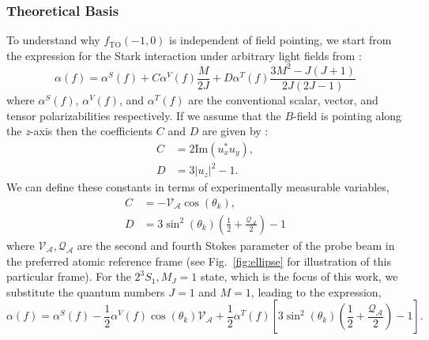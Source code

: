 \documentclass[%
 amsmath,amssymb,
aps,
]{revtex4-2}
\begin{document}
 \subsubsection{Theoretical Basis}
 To understand why \(f_{\mathrm{TO}}(-1,0)\) is independent of field pointing, we start from the expression for the Stark interaction under arbitrary light fields from  \cite[Eq. 19]{LeKien2013}:
 \begin{equation}
    \alpha(f) = \alpha^S(f) + C \alpha^V(f) \frac{M}{2J} + D \alpha^T(f) \frac{3M^2-J(J+1)}{2J(2J-1)}
    \label{eq:polarizability_full_1}
\end{equation}
where \(\alpha^S(f)\), \(\alpha^V(f)\), and \(\alpha^T(f)\) are the conventional scalar, vector, and tensor polarizabilities respectively. If we assume that the \(B\)-field is pointing along the \textit{z}-axis then the coefficients \(C\) and \(D\) are given by \cite[Eq. 20]{LeKien2013}:
\begin{align}
    C &= 2 \text{Im}(u_x^* u_y),\\
    D &= 3|u_z|^2 -1.
\end{align}
We can define these constants in terms of experimentally measurable variables,
\begin{align}
     C &= - \mathcal{V_{A}} \cos \left( \theta_k \right), \\
     D &= 3 \sin^2\left( \theta_k \right) \left(\frac{1}{2} +  \frac{\mathcal{Q_{A}}}{2}\right) -1 
\end{align}
where \(\mathcal{V_{A}},\mathcal{Q_{A}}\) are the second and fourth Stokes parameter of the probe beam in the preferred atomic reference frame (see Fig.~\ref{fig:ellipse} for illustration of this particular frame). For the $2^3S_1, M_J=1$ state, which is the focus of this work, we substitute the quantum numbers $J=1$ and $M=1$, leading to the expression,
\begin{equation}
    \alpha(f) = \alpha^S(f) - 
    \frac{1}{2} \alpha^V(f)  \cos \left( \theta_k \right) \mathcal{V_{A}} + 
    \frac{1}{2} \alpha^T(f) \left[3 \sin^2\left( \theta_k \right) \left(\frac{1}{2} +  \frac{\mathcal{Q_{A}}}{2}\right) -1 \right].
    \label{eq:polarizability_full}
\end{equation}
 
\end{document}
